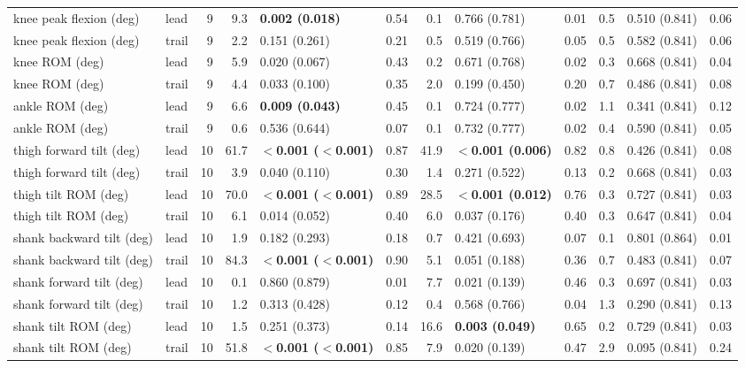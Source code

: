 \begin{adjustbox}{max width=\textwidth}
{\begin{tabular}{llrrlrrlrrlr}
knee peak flexion (deg) & lead & 9 & 9.3 & \textbf{0.002 (0.018)} & 0.54 & 0.1 & 0.766 (0.781) & 0.01 & 0.5 & 0.510 (0.841) & 0.06 \\
knee peak flexion (deg) & trail & 9 & 2.2 & 0.151 (0.261) & 0.21 & 0.5 & 0.519 (0.766) & 0.05 & 0.5 & 0.582 (0.841) & 0.06 \\
knee ROM (deg) & lead & 9 & 5.9 & 0.020 (0.067) & 0.43 & 0.2 & 0.671 (0.768) & 0.02 & 0.3 & 0.668 (0.841) & 0.04 \\
knee ROM (deg) & trail & 9 & 4.4 & 0.033 (0.100) & 0.35 & 2.0 & 0.199 (0.450) & 0.20 & 0.7 & 0.486 (0.841) & 0.08 \\
ankle ROM (deg) & lead & 9 & 6.6 & \textbf{0.009 (0.043)} & 0.45 & 0.1 & 0.724 (0.777) & 0.02 & 1.1 & 0.341 (0.841) & 0.12 \\
ankle ROM (deg) & trail & 9 & 0.6 & 0.536 (0.644) & 0.07 & 0.1 & 0.732 (0.777) & 0.02 & 0.4 & 0.590 (0.841) & 0.05 \\
thigh forward tilt (deg) & lead & 10 & 61.7 & \textbf{$<$0.001 ($<$0.001)} & 0.87 & 41.9 & \textbf{$<$0.001 (0.006)} & 0.82 & 0.8 & 0.426 (0.841) & 0.08 \\
thigh forward tilt (deg) & trail & 10 & 3.9 & 0.040 (0.110) & 0.30 & 1.4 & 0.271 (0.522) & 0.13 & 0.2 & 0.668 (0.841) & 0.03 \\
thigh tilt ROM (deg) & lead & 10 & 70.0 & \textbf{$<$0.001 ($<$0.001)} & 0.89 & 28.5 & \textbf{$<$0.001 (0.012)} & 0.76 & 0.3 & 0.727 (0.841) & 0.03 \\
thigh tilt ROM (deg) & trail & 10 & 6.1 & 0.014 (0.052) & 0.40 & 6.0 & 0.037 (0.176) & 0.40 & 0.3 & 0.647 (0.841) & 0.04 \\
shank backward tilt (deg) & lead & 10 & 1.9 & 0.182 (0.293) & 0.18 & 0.7 & 0.421 (0.693) & 0.07 & 0.1 & 0.801 (0.864) & 0.01 \\
shank backward tilt (deg) & trail & 10 & 84.3 & \textbf{$<$0.001 ($<$0.001)} & 0.90 & 5.1 & 0.051 (0.188) & 0.36 & 0.7 & 0.483 (0.841) & 0.07 \\
shank forward tilt (deg) & lead & 10 & 0.1 & 0.860 (0.879) & 0.01 & 7.7 & 0.021 (0.139) & 0.46 & 0.3 & 0.697 (0.841) & 0.03 \\
shank forward tilt (deg) & trail & 10 & 1.2 & 0.313 (0.428) & 0.12 & 0.4 & 0.568 (0.766) & 0.04 & 1.3 & 0.290 (0.841) & 0.13 \\
shank tilt ROM (deg) & lead & 10 & 1.5 & 0.251 (0.373) & 0.14 & 16.6 & \textbf{0.003 (0.049)} & 0.65 & 0.2 & 0.729 (0.841) & 0.03 \\
shank tilt ROM (deg) & trail & 10 & 51.8 & \textbf{$<$0.001 ($<$0.001)} & 0.85 & 7.9 & 0.020 (0.139) & 0.47 & 2.9 & 0.095 (0.841) & 0.24 \\

\end{tabular}}
\end{adjustbox}
